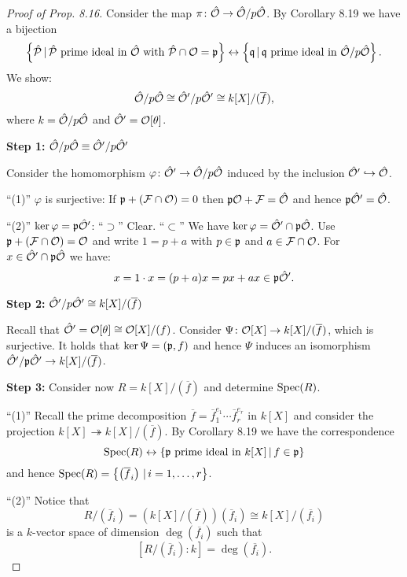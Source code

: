 \begin{proof}[Proof of Prop. 8.16]
Consider the map $\pi \colon \hat{\mathcal{O}} \to \hat{\mathcal{O}} / p\hat{\mathcal{O}}$. By Corollary 8.19 we have a bijection
\[ \left\{ \hat{\mathcal{P}} \, | \, \hat{\mathcal{P}} \text{ prime ideal in } \hat{\mathcal{O}} \text{ with }
\hat{\mathcal{P}} \cap \mathcal{O} = \mathfrak{p} \right\}
\leftrightarrow \left\{ \mathfrak{q} \, | \, \mathfrak{q} \text{ prime ideal in } \hat{\mathcal{O}} / p\hat{\mathcal{O}}
\right\}.
\]
We show:
\[ \hat{\mathcal{O}} / p\hat{\mathcal{O}}
\cong \hat{\mathcal{O}}' / p\hat{\mathcal{O}}'
\cong k[X] / (\overline{f}),
\]
where $k = \hat{\mathcal{O}} / p\hat{\mathcal{O}}$ and $\hat{\mathcal{O}}' = \mathcal{O}[\theta]$.

\bigskip \textbf{Step 1:} $\hat{\mathcal{O}} / p\hat{\mathcal{O}} \equiv \hat{\mathcal{O}}' / p\hat{\mathcal{O}}'$

Consider the homomorphism $\varphi \colon \hat{\mathcal{O}}' \to \hat{\mathcal{O}} / p\hat{\mathcal{O}}$ induced by the inclusion $\hat{\mathcal{O}}' \hookrightarrow \hat{\mathcal{O}}$.

\bigskip
\enquote{(1)} $\varphi$ is surjective:
If $\mathfrak{p} + (\mathcal{F} \cap \mathcal{O}) = 0$ then $\mathfrak{p}\mathcal{O} + \mathcal{F} = \hat{\mathcal{O}}$ and hence $\mathfrak{p} \hat{\mathcal{O}}' = \hat{\mathcal{O}}$.

\bigskip
\enquote{(2)} $\ker \varphi = \mathfrak{p} \hat{\mathcal{O}}'$:
\enquote{$\supset$} Clear.
\enquote{$\subset$} We have $\ker \varphi = \hat{\mathcal{O}}' \cap \mathfrak{p} \hat{\mathcal{O}}$.
Use $\mathfrak{p} +(\mathcal{F} \cap \mathcal{O}) = \mathcal{O}$ and write $1 = p+a$ with $p \in \mathfrak{p}$ and $a \in \mathcal{F} \cap \mathcal{O}$.
For $x \in \hat{\mathcal{O}}' \cap \mathfrak{p}\hat{\mathcal{O}}$ we have:
\[ x = 1\cdot x = (p+a)x = px +ax \in \mathfrak{p} \hat{\mathcal{O}}'.
\]

\bigskip \textbf{Step 2:} $\hat{\mathcal{O}}' / p\hat{\mathcal{O}}' \cong k[X] / (\overline{f})$

Recall that $\hat{\mathcal{O}}' = \mathcal{O}[\theta] \cong \mathcal{O}[X] / (f)$. Consider
$\Psi \colon \mathcal{O}[X] \to k[X] / (\overline{f})$, which is surjective. It holds that
$\ker \Psi = (\mathfrak{p}, f)$ and hence $\Psi$ induces an isomorphism 
$\hat{\mathcal{O}} ' / \mathfrak{p} \hat{\mathcal{O}}' \to k[X] / (\overline{f})$.


\bigskip \textbf{Step 3:}
Consider now $R =  k[X] / (\overline{f})$ and determine $\operatorname{Spec}(R)$.

\bigskip
\enquote{(1)} 
Recall the prime decomposition $\overline{f} = \overline{f}_1^{e_1} \cdots \overline{f}_r^{e_r}$ in $k[X]$ and consider the projection $k[X] \twoheadrightarrow 
k[X] / (\overline{f})$. By Corollary 8.19 we have the correspondence
\[ \operatorname{Spec}(R) \leftrightarrow 
\{ \mathfrak{p} \text{ prime ideal in } k[X] \, | \, f \in \mathfrak{p} \}
\]
and hence $\operatorname{Spec}(R)= \left\{ \left(  \overline{f}_i \right) \, | \, i = 1, \dots, r  \right\}$.

\bigskip
\enquote{(2)} 
Notice that
\[ R / \left(  \overline{f}_i \right)
= \left(  k[X] / (\overline{f}) \right) \left(  \overline{f}_i \right)
\cong k[X] / (\overline{f_i})
\]
is a $k$-vector space of dimension $\deg (\overline{f_i})$ such that
\[  \left[  R / \left(  \overline{f}_i \right)  \colon k \right]
= \deg (\overline{f_i}).
\]


\end{proof}
